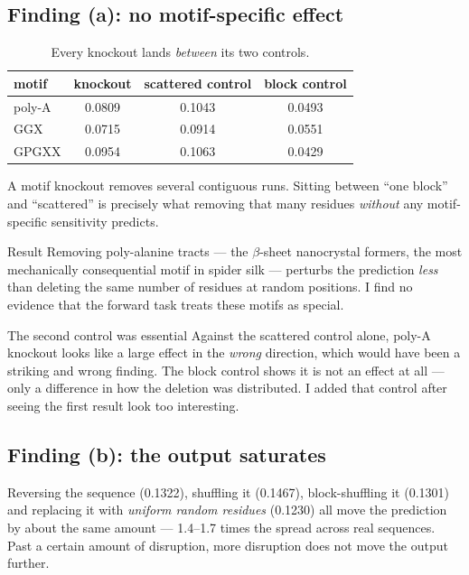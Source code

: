 \subsection{Finding (a): no motif-specific effect}

\begin{table}[htbp]
\centering\small
\caption[Knockouts vs controls]{Every knockout lands \emph{between} its two
controls.}
\begin{tabular}{lccc}
\toprule
\textbf{motif} & \textbf{knockout} & \textbf{scattered control} & \textbf{block control} \\
\midrule
poly-A & 0.0809 & 0.1043 & 0.0493 \\
GGX & 0.0715 & 0.0914 & 0.0551 \\
GPGXX & 0.0954 & 0.1063 & 0.0429 \\
\bottomrule
\end{tabular}
\end{table}

A motif knockout removes several contiguous runs. Sitting between ``one block''
and ``scattered'' is precisely what removing that many residues \emph{without}
any motif-specific sensitivity predicts.

\begin{goodbox}{Result}
Removing poly-alanine tracts --- the $\beta$-sheet nanocrystal formers, the most
mechanically consequential motif in spider silk --- perturbs the prediction
\emph{less} than deleting the same number of residues at random positions. I
find no evidence that the forward task treats these motifs as special.
\end{goodbox}

\begin{warnbox}{The second control was essential}
Against the scattered control alone, poly-A knockout looks like a large effect
in the \emph{wrong} direction, which would have been a striking and wrong
finding. The block control shows it is not an effect at all --- only a difference
in how the deletion was distributed. I added that control after seeing the
first result look too interesting.
\end{warnbox}

\subsection{Finding (b): the output saturates}

Reversing the sequence (0.1322), shuffling it (0.1467), block-shuffling it
(0.1301) and replacing it with \emph{uniform random residues} (0.1230) all move
the prediction by about the same amount --- 1.4--1.7 times the spread across real
sequences. Past a certain amount of disruption, more disruption does not move
the output further.

